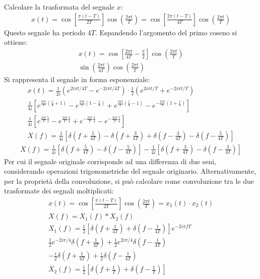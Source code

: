 \documentclass{article}
\begin{document}
Calcolare la trasformata del segnale $x$:
\begin{gather*}
    x(t)=\cos\left[\displaystyle\frac{\pi(t-T)}{2T}\right]\cos\left(\frac{2\pi t}{T}\right)=\cos\left[\displaystyle\frac{2\pi(t-T)}{4T}\right]\cos\left(\frac{2\pi t}{T}\right)
\end{gather*}
Questo segnale ha periodo $4T$. Espandendo l'argomento del primo coseno si ottiene:
\begin{gather*}
    x(t)=\displaystyle\cos\left[\frac{2\pi t}{4T}-\frac{\pi}{2}\right]\cos\left(\frac{2\pi t}{T}\right)\\
    \sin\left(\displaystyle\frac{2\pi t}{4T}\right)\cos\left(\frac{2\pi t}{T}\right)
\end{gather*}
Si rappresenta il segnale in forma esponenziale:
\begin{gather*}
    x(t)=\displaystyle\frac{1}{2i}\left(e^{2i\pi t/4T}-e^{-2i\pi t/4T}\right)\cdot\displaystyle\frac{1}{2}\left(e^{2i\pi t/T}+e^{-2i\pi t/T}\right)\\
    \displaystyle\frac{1}{4i}\left[e^{\frac{2\pi t}{T}\left(\frac{1}{4}+1\right)}-e^{\frac{2\pi t}{T}\left(1-\frac{1}{4}\right)}+e^{\frac{2\pi t}{T}\left(\frac{1}{4}-1\right)}-e^{-\frac{2\pi t}{T}\left(1+\frac{1}{4}\right)}\right]\\
    \displaystyle\frac{1}{4i}\left[e^{\frac{2\pi t}{T}\frac{5}{4}}-e^{\frac{2\pi t}{T}\frac{3}{4}}+e^{-\frac{2\pi t}{T}\frac{3}{4}}-e^{-\frac{2\pi t}{T}\frac{5}{4}}\right]\\
    X(f)=\displaystyle\frac{1}{4i}\left[\delta\left(f+\frac{5}{4T}\right)-\delta\left(f+\frac{3}{4T}\right)+\delta\left(f-\frac{3}{4T}\right)-\delta\left(f-\frac{5}{4T}\right)\right]
\end{gather*}
\begin{gather}
    X(f)=\displaystyle\frac{1}{4i}\left[\delta\left(f+\frac{5}{4T}\right)-\delta\left(f-\frac{5}{4T}\right)\right]-\frac{1}{4i}\left[\delta\left(f+\frac{3}{4T}\right)-\delta\left(f-\frac{3}{4T}\right)\right]
\end{gather}
Per cui il segnale originale corrisponde ad una differenza di due seni, considerando operazioni trigonometriche del segnale originario. Alternativamente, per la 
proprietà della convoluzione, si può calcolare come convoluzione tra le due trasformate dei segnali moltiplicati:
\begin{gather*}
    x(t)=\cos\left[\displaystyle\frac{\pi(t-T)}{2T}\right]\cos\left(\frac{2\pi t}{T}\right)=x_1(t)\cdot x_2(t)\\
    X(f)=X_1(f)*X_2(f)\\
    X_1(f)=\displaystyle\frac{1}{2}\left[\delta\left(f+\frac{1}{4T}\right)+\delta\left(f-\frac{1}{4T}\right)\right]e^{-2i\pi fT}\\
    \displaystyle\frac{1}{2}e^{-2i\pi/4}\delta\left(f+\frac{1}{4T}\right)+\frac{1}{2}e^{2i\pi /4}\delta\left(f-\frac{1}{4T}\right)\\
    \displaystyle-\frac{i}{2}\delta\left(f+\frac{1}{4T}\right)+\frac{i}{2}\delta\left(f-\frac{1}{4T}\right)\\
    X_2(f)=\displaystyle\frac{1}{2}\left[\delta\left(f+\frac{1}{T}\right)+\delta\left(f-\frac{1}{T}\right)\right]
\end{gather*}
\end{document}
